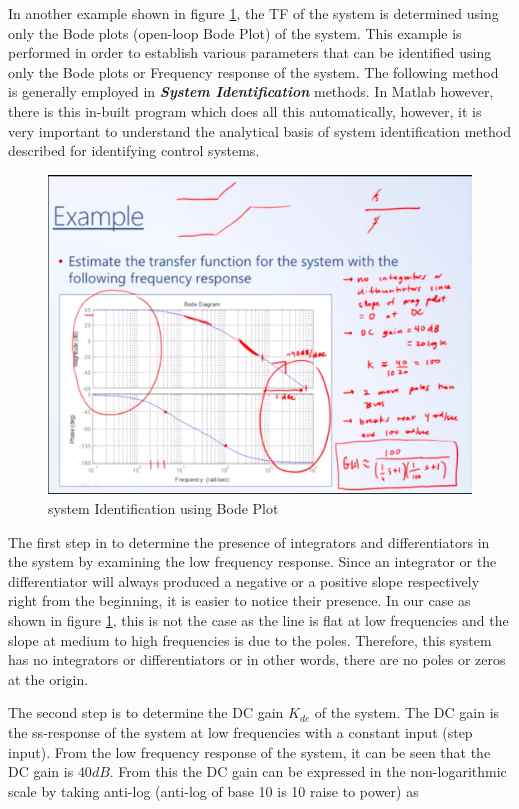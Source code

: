 In another example shown in figure \ref{Fig_FrequencyResp_ExampleProb2}, the TF of the system is determined using only the Bode plots (open-loop Bode Plot) of the system. This example is performed in order to establish various parameters that can be identified using only the Bode plots or Frequency response of the system. The following method is generally employed in \textbf{\textit{System Identification}} methods. In Matlab however, there is this in-built program which does all this automatically, however, it is very important to understand the analytical basis of system identification method described for identifying control systems.
\begin{figure}[h!]
	\centering
	\includegraphics[width=\linewidth]{Bilder/FreqResp_Example2}
	\caption{system Identification using Bode Plot}
	\label{Fig_FrequencyResp_ExampleProb2}
\end{figure}

The first step in to determine the presence of integrators and differentiators in the system by examining the low frequency response. Since an integrator or the differentiator will always produced a negative or a positive slope respectively right from the beginning, it is easier to notice their presence. In our case as shown in figure \ref{Fig_FrequencyResp_ExampleProb2}, this is not the case as the line is flat at low frequencies and the slope at medium to high frequencies is due to the poles. Therefore, this system has no integrators or differentiators or in other words, there are no poles or zeros at the origin.

The second step is to determine the DC gain $K_{dc}$ of the system. The DC gain is the ss-response of the system at low frequencies with a constant input (step input). From the low frequency response of the system, it can be seen that the DC gain is $40 dB$. From this the DC gain can be expressed in the non-logarithmic scale by taking anti-log (anti-log of base 10 is 10 raise to power) as 

